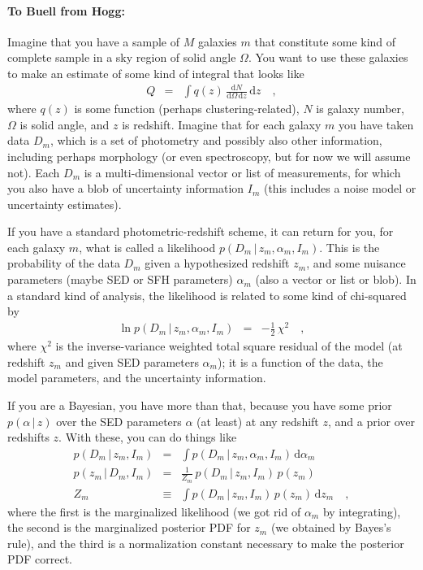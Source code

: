 \documentclass[12pt]{article}
\newcommand{\given}{\,|\,}
\newcommand{\dd}{\mathrm d}
\begin{document}
\paragraph{To Buell from Hogg:}
Imagine that you have a sample of $M$ galaxies $m$ that constitute
some kind of complete sample in a sky region of solid angle $\Omega$.
You want to use these galaxies to make an estimate of some kind of
integral that looks like
\begin{eqnarray}\displaystyle
Q &=& \int q(z)\,\frac{\dd N}{\dd \Omega\,\dd z}\,\dd z
\quad ,
\end{eqnarray}
where $q(z)$ is some function (perhaps clustering-related), $N$ is
galaxy number, $\Omega$ is solid angle, and $z$ is redshift.  Imagine
that for each galaxy $m$ you have taken data $D_m$, which is a set of
photometry and possibly also other information, including perhaps
morphology (or even spectroscopy, but for now we will assume not).
Each $D_m$ is a multi-dimensional vector or list of measurements, for
which you also have a blob of uncertainty information $I_m$ (this
includes a noise model or uncertainty estimates).

If you have a standard photometric-redshift scheme, it can return for
you, for each galaxy $m$, what is called a likelihood $p(D_m \given
z_m,\alpha_m,I_m)$.  This is the probability of the data $D_m$ given a
hypothesized redshift $z_m$, and some nuisance parameters (maybe SED
or SFH parameters) $\alpha_m$ (also a vector or list or blob).  In a
standard kind of analysis, the likelihood is related to some kind of
chi-squared by
\begin{eqnarray}
\ln p(D_m \given z_m, \alpha_m, I_m) &=& -\frac{1}{2}\,\chi^2
\quad,
\end{eqnarray}
where $\chi^2$ is the inverse-variance weighted total square residual
of the model (at redshift $z_m$ and given SED parameters $\alpha_m$);
it is a function of the data, the model parameters, and the
uncertainty information.

If you are a Bayesian, you have more than that, because you have some
prior $p(\alpha \given z)$ over the SED parameters $\alpha$ (at least)
at any redshift $z$, and a prior over redshifts $z$.  With these, you
can do things like
\begin{eqnarray}
p(D_m \given z_m, I_m) &=& \int p(D_m \given z_m, \alpha_m, I_m)\,\dd \alpha_m
\\
p(z_m \given D_m, I_m) &=& \frac{1}{Z_m}\,p(D_m \given z_m, I_m)\,p(z_m)
\\
Z_m &\equiv& \int p(D_m \given z_m, I_m)\,p(z_m)\,\dd z_m
\quad ,
\end{eqnarray}
where the first is the marginalized likelihood (we got rid of
$\alpha_m$ by integrating), the second is the marginalized posterior
PDF for $z_m$ (we obtained by Bayes's rule), and the third is a
normalization constant necessary to make the posterior PDF correct.
\end{document}
